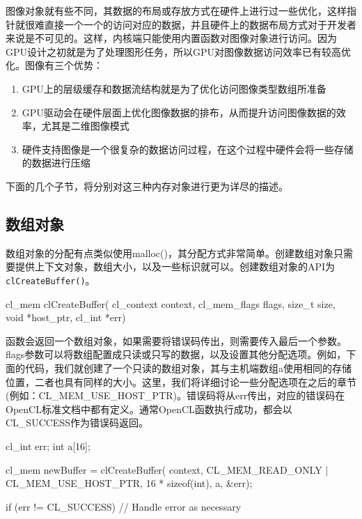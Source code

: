 图像对象就有些不同，其数据的布局或存放方式在硬件上进行过一些优化，这样指针就很难直接一个一个的访问对应的数据，并且硬件上的数据布局方式对于开发者来说是不可见的。这样，内核端只能使用内置函数对图像对象进行访问。因为GPU设计之初就是为了处理图形任务，所以GPU对图像数据访问效率已有较高优化。图像有三个优势：

\begin{enumerate}
\item GPU上的层级缓存和数据流结构就是为了优化访问图像类型数组所准备
\item GPU驱动会在硬件层面上优化图像数据的排布，从而提升访问图像数据的效率，尤其是二维图像模式
\item 硬件支持图像是一个很复杂的数据访问过程，在这个过程中硬件会将一些存储的数据进行压缩
\end{enumerate}

下面的几个子节，将分别对这三种内存对象进行更为详尽的描述。

\subsection{数组对象}

数组对象的分配有点类似使用malloc()，其分配方式非常简单。创建数组对象只需要提供上下文对象，数组大小，以及一些标识就可以。创建数组对象的API为\texttt{clCreateBuffer()}。

\begin{codebox}[cpp]
cl_mem
clCreateBuffer(
  cl_context context,
  cl_mem_flags flags,
  size_t size,
  void *host_ptr,
  cl_int *err)
\end{codebox}

函数会返回一个数组对象，如果需要将错误码传出，则需要传入最后一个参数。flags参数可以将数组配置成只读或只写的数据，以及设置其他分配选项。例如，下面的代码，我们就创建了一个只读的数组对象，其与主机端数组a使用相同的存储位置，二者也具有同样的大小。这里，我们将详细讨论一些分配选项在之后的章节(例如：CL\_\allowbreak{}MEM\_\allowbreak{}USE\_\allowbreak{}HOST\_\allowbreak{}PTR)。错误码将从err传出，对应的错误码在OpenCL标准文档中都有定义。通常OpenCL函数执行成功，都会以CL\_\allowbreak{}SUCCESS作为错误码返回。

\begin{codebox}[cpp]
cl_int err;
int a[16];

cl_mem newBuffer = clCreateBuffer(
  context,
  CL_MEM_READ_ONLY | CL_MEM_USE_HOST_PTR,
  16 * sizeof(int),
  a,
  &err);

if (err != CL_SUCCESS){
  // Handle error as necessary
}
\end{codebox}

